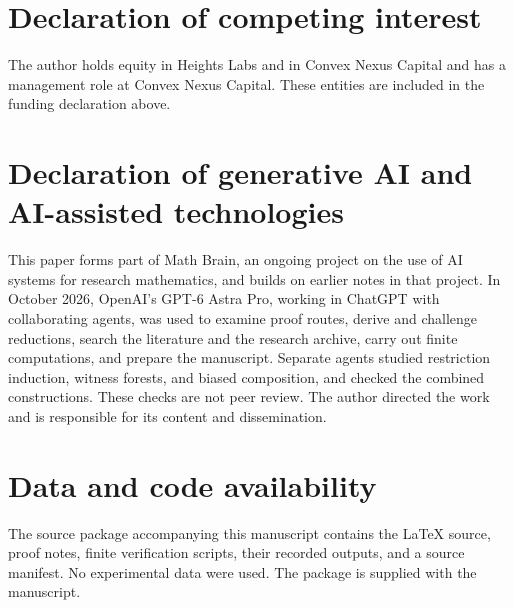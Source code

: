 \section*{Declaration of competing interest}
The author holds equity in Heights Labs and in Convex Nexus Capital and
has a management role at Convex Nexus Capital. These entities are included
in the funding declaration above.

\section*{Declaration of generative AI and AI-assisted technologies}
This paper forms part of Math Brain, an ongoing project on the use of AI
systems for research mathematics, and builds on earlier notes in that
project. In October 2026, OpenAI's GPT-6 Astra Pro, working in ChatGPT with
collaborating agents, was used to examine proof routes, derive and challenge
reductions, search the literature and the research archive, carry out finite
computations, and prepare the manuscript. Separate agents studied
restriction induction, witness forests, and biased composition, and checked
the combined constructions. These checks are not peer review. The author
directed the work and is responsible for its content and dissemination.

\section*{Data and code availability}
The source package accompanying this manuscript contains the LaTeX source,
proof notes, finite verification scripts, their recorded outputs, and a
source manifest. No experimental data were used. The package is supplied
with the manuscript.

